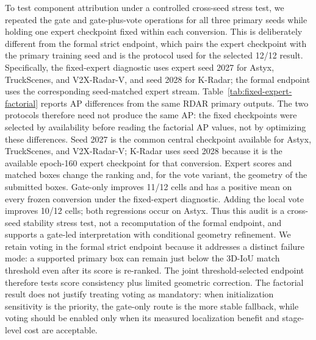 \documentclass[preprint,12pt,times]{elsarticle}
\begin{document}
To test component attribution under a controlled cross-seed stress test, we
repeated the gate and gate-plus-vote operations for all three primary seeds
while holding one expert checkpoint fixed within each conversion. This is
deliberately different from the formal strict endpoint, which pairs the
expert checkpoint with the primary training seed and is the protocol used for
the selected 12/12 result. Specifically, the fixed-expert diagnostic uses
expert seed 2027 for Astyx, TruckScenes, and V2X-Radar-V, and seed 2028 for
K-Radar; the formal endpoint uses the corresponding seed-matched expert
stream. Table~\ref{tab:fixed-expert-factorial} reports AP differences from the
same RDAR primary outputs. The two protocols therefore need not produce the
same AP: the fixed checkpoints were selected by availability before reading
the factorial AP values, not by optimizing these differences. Seed 2027 is
the common central checkpoint available for Astyx, TruckScenes, and
V2X-Radar-V; K-Radar uses seed 2028 because it is the available epoch-160
expert checkpoint for that conversion. Expert scores and matched boxes change
the ranking and, for the vote
variant, the geometry of the submitted boxes. Gate-only improves 11/12 cells
and has a positive mean on every frozen conversion under the fixed-expert
diagnostic. Adding the local vote improves 10/12 cells; both regressions occur
on Astyx. Thus this audit is a cross-seed stability stress test, not a
recomputation of the formal endpoint, and supports a gate-led interpretation
with conditional geometry refinement.
We retain voting in the formal strict endpoint because it addresses a distinct
failure mode: a supported primary box can remain just below the 3D-IoU match
threshold even after its score is re-ranked. The joint threshold-selected
endpoint therefore tests score consistency plus limited geometric correction.
The factorial result does not justify treating voting as mandatory: when
initialization sensitivity is the priority, the gate-only route is the more
stable fallback, while voting should be enabled only when its measured
localization benefit and stage-level cost are acceptable.
\end{document}

